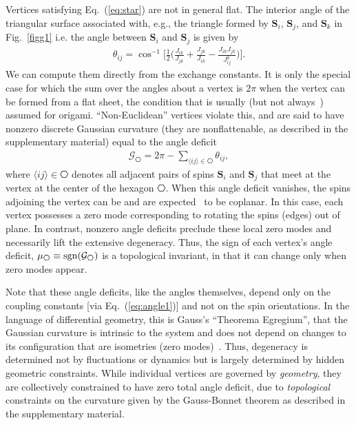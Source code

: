 \documentclass[a4paper,aps,prl,twocolumn,floatfix,showpacs,superscriptaddress]{revtex4-1}
\def\spin{\mathbf{S}} %
\begin{document}
Vertices satisfying Eq.~(\ref{eq:star}) are not in general flat. The interior angle of the triangular surface associated with, e.g., the triangle formed by $\spin_i$, $\spin_j$, and $\spin_k$ in Fig.~\ref{figg1} i.e. the angle between $\spin_i$ and $\spin_j$ is given by
\begin{align}
\label{eq:angle1}
\theta_{ij} = \cos^{-1}\bigg[\frac{1}{2} \bigg( \frac{J_{ik}}{J_{jk}} + \frac{J_{jk}}{J_{ik}} - \frac{J_{ik}J_{jk}}{J_{ij}^2} \bigg)\bigg].
\end{align}
We can compute them directly from the exchange constants. It is only the special case for which the sum over the angles about a vertex is $2\pi$ when the vertex can be formed from a flat sheet, the condition that is usually (but not always~\cite{xuehoutan2005discrete, santangelo2017extreme}) assumed for origami. ``Non-Euclidean'' vertices violate this, and are said to have nonzero discrete Gaussian curvature (they are nonflattenable, as described in the supplementary material) equal to the angle deficit~\cite{meyer2003discrete}
\begin{align}
\label{eq:angle2}
\mathcal{G}_{\hexagon} = 2\pi - \sum_{\langle ij \rangle \in \hexagon} \theta_{ij},
\end{align}
where $\langle ij \rangle \in \hexagon$ denotes all adjacent pairs of spins $\spin_i$ and $\spin_j$ that meet at the vertex at the center of the hexagon $\hexagon$.
When this angle deficit vanishes, the spins adjoining the vertex can be and are expected~\cite{chubukov1992order} to be coplanar. In this case, each vertex possesses a zero mode corresponding to rotating the spins (edges) out of plane. In contrast, nonzero angle deficits preclude these local zero modes and necessarily lift the extensive degeneracy. 
Thus, the sign of each vertex's angle deficit, $\mu_{\hexagon} \equiv \rm{sgn}(\mathcal{G}_{\hexagon})$ is a topological invariant, in that it can change only when zero modes appear.

Note that these angle deficits, like the angles themselves, depend only on the coupling constants [via Eq.~(\ref{eq:angle1})] and not on the spin orientations. In the language of differential geometry, this is Gauss's ``Theorema Egregium'', that the Gaussian curvature is intrinsic to the system and does not depend on changes to its configuration that are isometries (zero modes)~\cite{gauss2013general, tapp2016differential}. Thus, degeneracy is determined not by fluctuations or dynamics but is largely determined by hidden geometric constraints. While individual vertices are governed by \emph{geometry}, they are collectively constrained to have zero total angle deficit, due to \emph{topological} constraints on the curvature given by the Gauss-Bonnet theorem as described in the supplementary material.
\end{document}
